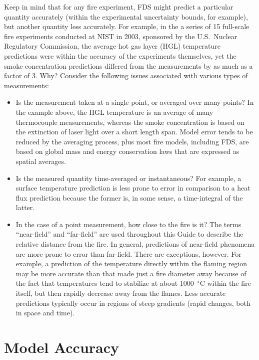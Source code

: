 Keep in mind that for any fire experiment, FDS might predict a particular quantity accurately (within the experimental uncertainty bounds, for example), but another quantity less
accurately. For example, in the a series of 15 full-scale fire experiments conducted at NIST in 2003, sponsored by the U.S.~Nuclear Regulatory Commission, the
average hot gas layer (HGL) temperature predictions were within the accuracy of the experiments themselves, yet the smoke concentration predictions differed from the
measurements by as much as a factor of 3. Why? Consider the following issues associated with various types of measurements:
\begin{itemize}
\item Is the measurement taken at a single point, or averaged over many points? In the example above, the HGL temperature is an average of many
thermocouple measurements, whereas the smoke concentration is based on the extinction of laser light over a short length span. Model error tends to be
reduced by the averaging process, plus most fire models, including FDS, are based on global mass and energy conservation laws that are expressed as
spatial averages.
\item Is the measured quantity time-averaged or instantaneous? For example, a surface temperature prediction is less prone to error in comparison to a
heat flux prediction because the former is, in some sense, a time-integral of the latter.
\item In the case of a point measurement, how close to the fire is it? The terms ``near-field'' and ``far-field'' are used throughout this Guide to describe
the relative distance from the fire. In general, predictions of near-field phenomena are more prone to error than far-field. There are exceptions, however. For example,
a prediction of the temperature directly within the flaming region may be more accurate than that made just a fire diameter away because of the fact that temperatures
tend to stabilize at about 1000~$^\circ$C within the fire itself, but then rapidly decrease away from the flames. Less accurate predictions typically occur in regions
of steep gradients (rapid changes, both in space and time).
\end{itemize}




\section{Model Accuracy}

